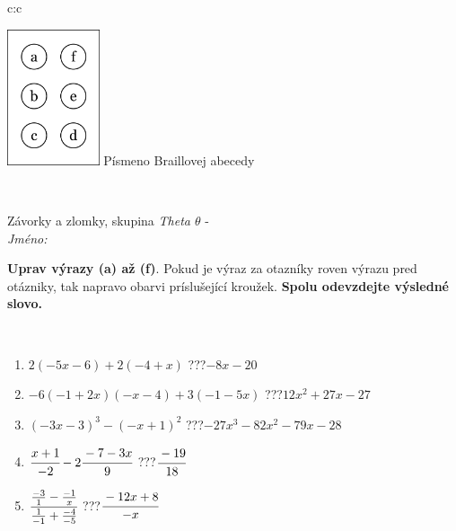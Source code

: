 \documentclass[10pt]{report}
\begin{document}
\begin{tabular}{c:c}
\begin{minipage}[c][104.5mm][t]{0.5\linewidth}
\begin{center}
\begin{minipage}{0.20\linewidth}
\begin{center}
\includegraphics[height=40mm]{../images/braille.png}
{\small Písmeno Braillovej abecedy}
\end{center}
\end{minipage}
\end{center}
\end{minipage}
\\ \hdashline
\begin{minipage}[c][104.5mm][t]{0.5\linewidth}
\begin{center}
\vspace{7mm}
{\huge Závorky a zlomky, skupina \textit{Theta $\theta$} -}\\[5mm]
\textit{Jméno:}\phantom{xxxxxxxxxxxxxxxxxxxxxxxxxxxxxxxxxxxxxxxxxxxxxxxxxxxxxxxxxxxxxxxxx}\\[5mm]
\begin{minipage}{0.95\linewidth}
\begin{center}
\textbf{Uprav výrazy (a) až (f)}. Pokud je výraz za otazníky roven výrazu pred otázniky, tak napravo obarvi príslušející kroužek. \textbf{Spolu odevzdejte výsledné slovo.}
\end{center}
\end{minipage}
\\[1mm]
\begin{minipage}{0.79\linewidth}
\begin{center}
\begin{varwidth}{\linewidth}
\begin{enumerate}
\normalsize
\item $2(-5x-6)+2(-4+x)$\quad \dotfill\; ???\;\dotfill \quad $-8x-20$
\item $-6(-1+2x)(-x-4)+3(-1-5x)$\quad \dotfill\; ???\;\dotfill \quad $12x^2+27x-27$
\item $(-3x-3)^3-(-x+1)^2$\quad \dotfill\; ???\;\dotfill \quad $-27x^3-82x^2-79x-28$
\item $\cfrac{x+1}{-2}-2\cfrac{-7-3x}{9}$\quad \dotfill\; ???\;\dotfill \quad $\cfrac{-19}{18}$
\item $\cfrac{\frac{-3}{1}-\frac{-1}{x}}{\frac{1}{-1}+\frac{-4}{-5}}$\quad \dotfill\; ???\;\dotfill \quad $\cfrac{-12x+8}{-x}$

\end{enumerate}
\end{varwidth}
\end{center}
\end{minipage}
\end{center}
\end{minipage}
\end{tabular}
\end{document}
